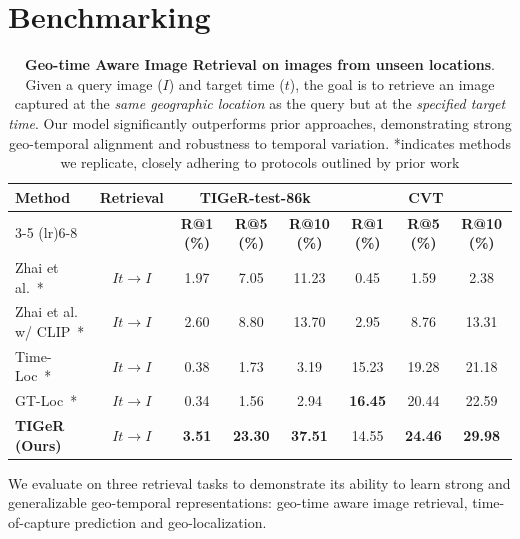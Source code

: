 \section{Benchmarking}

\begin{table}
    \centering
    \setlength{\tabcolsep}{2pt}
    \renewcommand{\arraystretch}{1.0}
    \caption{\textbf{Geo-time Aware Image Retrieval on images from unseen locations}. Given a query image ($I$) and target time ($t$), the goal is to retrieve an image captured at the \textit{same geographic location} as the query but at the \textit{specified target time}. Our model significantly outperforms prior approaches, demonstrating strong geo-temporal alignment and robustness to temporal variation.  *indicates methods we replicate, closely adhering to protocols outlined by prior work
    }
    \label{tab:sota}
    \begin{tabular}{lccccccc} 
        \toprule
        \multirow{2}{*}{\textbf{Method}} & \multirow{2}{*}{\textbf{Retrieval}} & \multicolumn{3}{c}{\textbf{TIGeR-test-86k}} & \multicolumn{3}{c}{\textbf{CVT}} \\
        \cmidrule(lr){3-5} \cmidrule(lr){6-8}  
        &  &\textbf{R@1 (\%)} & \textbf{R@5 (\%)} & \textbf{R@10 (\%)} & \textbf{R@1 (\%)} & \textbf{R@5 (\%)} & \textbf{R@10 (\%)} \\
        \midrule
        Zhai et al.~\cite{zhai2019learning}* & $It \rightarrow I$ & 1.97 & 7.05 & 11.23 & 0.45 & 1.59 & 2.38 \\
        Zhai et al. w/ CLIP~\cite{zhai2019learning}* & $It \rightarrow I$ & 2.60 & 8.80 & 13.70 & 2.95 & 8.76 & 13.31 \\
        Time-Loc~\cite{Shatwell_2025_ICCV}* & $It \rightarrow I$ & 0.38 & 1.73 & 3.19 & 15.23 & 19.28 & 21.18 \\
        GT-Loc~\cite{Shatwell_2025_ICCV}* & $It \rightarrow I$ & 0.34 & 1.56 & 2.94 & \textbf{16.45} & 20.44 & 22.59 \\
        \midrule
        \textbf{TIGeR (Ours)} & $It \rightarrow I$ & \textbf{3.51} & \textbf{23.30} & \textbf{37.51} & 14.55 & \textbf{24.46} & \textbf{29.98} \\
        \bottomrule
    \end{tabular}
    \vspace{-1em}
\end{table}

We evaluate \tiger on three retrieval tasks to demonstrate its ability to learn strong and generalizable geo-temporal representations: geo-time aware image retrieval, time-of-capture prediction and geo-localization.

